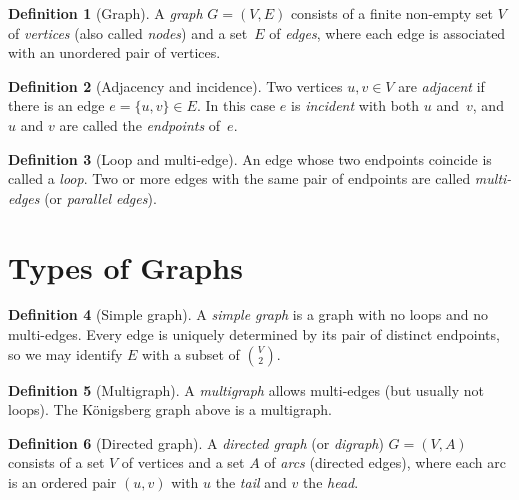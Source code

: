 \documentclass[12pt,a4paper,openany]{book}
\theoremstyle{definition}
\newtheorem{definition}{Definition}[chapter]
\theoremstyle{plain}
\theoremstyle{remark}
\begin{document}
\begin{definition}[Graph]\label{def:graph}
A \emph{graph} $G = (V, E)$ consists of a finite non-empty set $V$ of
\emph{vertices} (also called \emph{nodes}) and a set~$E$
of \emph{edges}, where each edge is associated with an
unordered pair of vertices.
\end{definition}

\begin{definition}[Adjacency and incidence]\label{def:adjacency}
Two vertices $u, v \in V$ are \emph{adjacent} if there is an edge
$e = \{u,v\} \in E$.  In this case $e$ is \emph{incident} with both $u$
and~$v$, and $u$ and $v$ are called the \emph{endpoints} of~$e$.
\end{definition}

\begin{definition}[Loop and multi-edge]\label{def:loop-multiedge}
An edge whose two endpoints coincide is called a \emph{loop}.  Two or
more edges with the same pair of endpoints are called \emph{multi-edges}
(or \emph{parallel edges}).
\end{definition}

\section{Types of Graphs}\label{sec:graph-types}

\begin{definition}[Simple graph]\label{def:simple-graph}
A \emph{simple graph} is a graph with no loops and no multi-edges.
Every edge is uniquely determined by its pair of distinct endpoints, so
we may identify $E$ with a subset of $\binom{V}{2}$.
\end{definition}

\begin{definition}[Multigraph]\label{def:multigraph}
A \emph{multigraph} allows multi-edges (but usually not loops).  The
K\"onigsberg graph above is a multigraph.
\end{definition}

\begin{definition}[Directed graph]\label{def:digraph}
A \emph{directed graph} (or \emph{digraph}) $G = (V, A)$ consists of a
set $V$ of vertices and a set $A$ of \emph{arcs} (directed
edges), where each arc is an ordered pair $(u, v)$ with $u$ the
\emph{tail} and $v$ the \emph{head}.
\end{definition}
\end{document}

